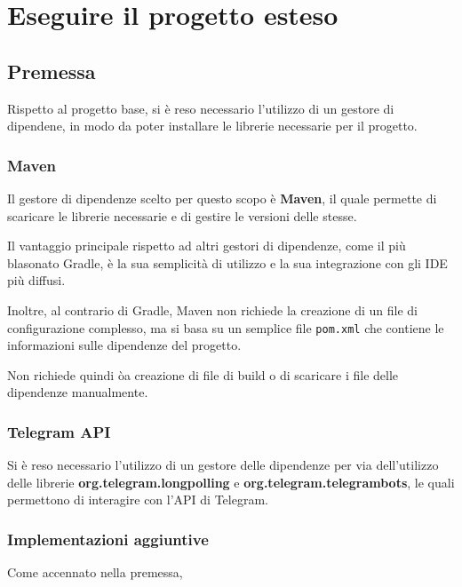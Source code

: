 \section{Eseguire il progetto esteso}

\subsection{Premessa}

Rispetto al progetto base, si è reso necessario l'utilizzo di un gestore di dipendene, in modo da poter installare le librerie necessarie per il progetto. 

\subsubsection*{Maven}

Il gestore di dipendenze scelto per questo scopo è \textbf{Maven}, il quale permette di scaricare le librerie necessarie e di gestire le versioni delle stesse.

Il vantaggio principale rispetto ad altri gestori di dipendenze, come il più blasonato Gradle, è la sua semplicità di utilizzo e la sua integrazione con gli IDE più diffusi. 

Inoltre, al contrario di Gradle, Maven non richiede la creazione di un file di configurazione complesso, ma si basa su un semplice file \texttt{pom.xml} che contiene le informazioni sulle dipendenze del progetto. 

Non richiede quindi òa creazione di file di build o di scaricare i file delle dipendenze manualmente. 

\subsubsection*{Telegram API}

Si è reso necessario l'utilizzo di un gestore delle dipendenze per via dell'utilizzo delle librerie \textbf{org.telegram.longpolling} e \textbf{org.telegram.telegrambots}, le quali permettono di interagire con l'API di Telegram. 

\subsubsection{Implementazioni aggiuntive}

Come accennato nella premessa, 



